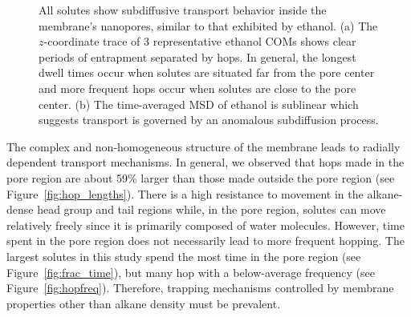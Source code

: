 \documentclass[journal=jpcbfk,manuscript=article]{achemso}
\begin{document}
\begin{figure}[!htb]
\begin{subfigure}{0.49\textwidth}
  \caption{}\label{fig:example_msd}
  \end{subfigure}
  \caption{All solutes show subdiffusive transport behavior inside the membrane's
  nanopores, similar to that exhibited by ethanol. (a) The $z$-coordinate trace of
  3 representative ethanol COMs shows clear periods of entrapment separated by hops.
  In general, the longest dwell times occur when solutes are situated far from the
  pore center and more frequent hops occur when solutes are close to the pore center.
  (b) The time-averaged MSD of ethanol is sublinear which suggests transport is
  governed by an anomalous subdiffusion process.}\label{fig:qualitative_mechanisms}
  \end{figure}
  
  The complex and non-homogeneous structure of the membrane leads to radially
  dependent transport mechanisms. In general, we observed that hops 
  made in the pore region are about 59\% larger than those made outside
  the pore region (see Figure~\ref{fig:hop_lengths}). There is a high 
  resistance to movement in the alkane-dense head group and tail regions
  while, in the pore region, solutes can move relatively freely since it 
  is primarily composed of water molecules. However, time spent in the 
  pore region does not necessarily lead to more frequent hopping. The 
  largest solutes in this study spend the most time in the pore region
  (see Figure~\ref{fig:frac_time}), but many hop with a below-average
  frequency (see Figure~\ref{fig:hopfreq}). Therefore, trapping mechanisms
  controlled by membrane properties other than alkane density must be prevalent.

 
\end{document}
